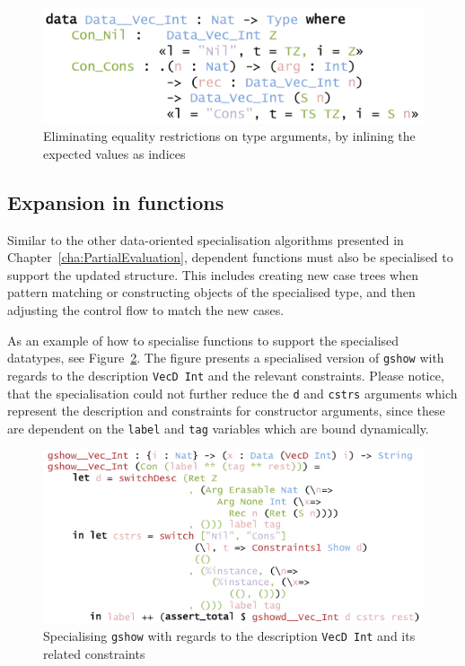 \documentclass{ituthesis}
\newcommand{\tttype}[1]{\textcolor{type-color}{\texttt{#1}}}
\newcommand{\ttdec}[1]{\textcolor{declared-var-color}{\texttt{#1}}}
\newcommand{\ttvar}[1]{\textcolor{local-var-color}{\texttt{#1}}}
\theoremstyle{break}
\begin{document}
\begin{figure}[ht]
\begin{center}
    \includegraphics[scale=0.5]{Figures/PESubst.png}
\end{center}
\caption{Eliminating equality restrictions on type arguments, by inlining the expected values as indices}
\label{fig:pesubst}
\end{figure}


\subsection{Expansion in functions}
\label{sub:Expansion in functions}
Similar to the other data-oriented specialisation algorithms presented in Chapter~\ref{cha:PartialEvaluation}, dependent functions must also be specialised to support the updated structure.
This includes creating new case trees when pattern matching or constructing objects of the specialised type, and then adjusting the control flow to match the new cases.

As an example of how to specialise functions to support the specialised datatypes, see Figure~\ref{fig:genericshow1}.
The figure presents a specialised version of \ttdec{gshow} with regards to the description \ttdec{VecD}~\tttype{Int} and the relevant constraints.
Please notice, that the specialisation could not further reduce the \ttvar{d} and \ttvar{cstrs} arguments which represent the description and constraints for constructor arguments,
since these are dependent on the \ttvar{label} and \ttvar{tag} variables which are bound dynamically.

\begin{figure}[ht]
\begin{center}
    \includegraphics[scale=0.5]{Figures/PEGenericShow1.png}
\end{center}
\caption{Specialising \ttdec{gshow} with regards to the description \ttdec{VecD}~\tttype{Int} and its related constraints}
\label{fig:genericshow1}
\end{figure}
\end{document}
